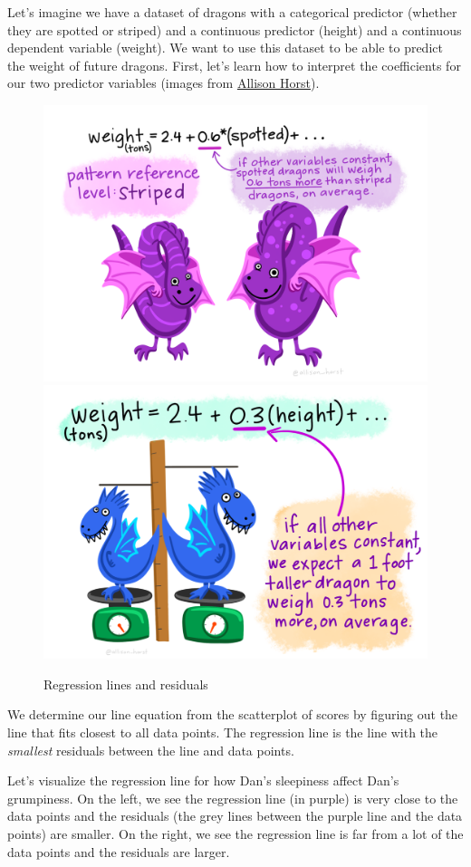\documentclass[
]{book}
\begin{document}
Let's imagine we have a dataset of dragons with a categorical predictor (whether they are spotted or striped) and a continuous predictor (height) and a continuous dependent variable (weight). We want to use this dataset to be able to predict the weight of future dragons. First, let's learn how to interpret the coefficients for our two predictor variables (images from \href{https://github.com/allisonhorst/stats-illustrations\#multiple-linear-regression-dragons-thread}{Allison Horst}).

\begin{figure}

{\centering \includegraphics[width=0.49\linewidth]{images/13-regression/dragon_categorical} \includegraphics[width=0.49\linewidth]{images/13-regression/dragons_continuous} 

}

\caption{Regression lines and residuals}\label{fig:unnamed-chunk-1}
\end{figure}

We determine our line equation from the scatterplot of scores by figuring out the line that fits closest to all data points. The regression line is the line with the \emph{smallest} residuals between the line and data points.

Let's visualize the regression line for how Dan's sleepiness affect Dan's grumpiness. On the left, we see the regression line (in purple) is very close to the data points and the residuals (the grey lines between the purple line and the data points) are smaller. On the right, we see the regression line is far from a lot of the data points and the residuals are larger.
\end{document}

